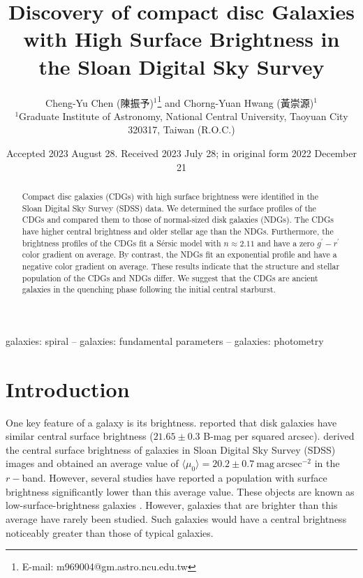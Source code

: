 \documentclass[fleqn,usenatbib]{mnras}
\title[CDGs in SDSS]{Discovery of compact disc Galaxies with High Surface Brightness in the Sloan Digital Sky Survey}
\author[Chen \& Hwang]{
Cheng-Yu Chen (陳振予)$^{1}$\thanks{E-mail: m969004@gm.astro.ncu.edu.tw}
and Chorng-Yuan Hwang (黃崇源)$^{1}$
\\
$^{1}$Graduate Institute of Astronomy, National Central University, Taoyuan City 320317, Taiwan (R.O.C.)\\
}
\date{Accepted 2023 August 28. Received 2023 July 28; in original form 2022 December 21}
\begin{document}
\begin{CJK*}{UTF8}{bkai}
\label{firstpage}
\pagerange{\pageref{firstpage}--\pageref{lastpage}}
\maketitle
\end{CJK*}

\begin{abstract}
Compact disc galaxies (CDGs) with high surface brightness were identified in the Sloan Digital Sky Survey (SDSS) data.
We determined the surface profiles of the CDGs and compared them to those of normal-sized disk galaxies (NDGs).
The CDGs have higher central brightness and older stellar age than the NDGs.
Furthermore, the brightness profiles of the CDGs fit a S{\'e}rsic model with $n \approx 2.11$ and have a zero $g^{\prime}-r^{\prime}$ color gradient on average.
By contrast, the NDGs fit an exponential profile and have a negative color gradient on average.
These results indicate that the structure and stellar population of the CDGs and NDGs differ.
We suggest that the CDGs are ancient galaxies in the quenching phase following the initial central starburst.
\end{abstract}

\begin{keywords}
galaxies: spiral -- galaxies: fundamental parameters -- galaxies: photometry
\end{keywords}



\section{Introduction}

One key feature of a galaxy is its brightness.
\citet{1970ApJ...160..811F} reported that disk galaxies have similar central surface brightness ($21.65\pm0.3$ B-mag per squared arcsec).
\citet{2010ApJ...722L.120F} derived the central surface brightness of galaxies in Sloan Digital Sky Survey (SDSS) images and obtained an average value of $\langle \mu_0 \rangle =20.2\pm0.7~\mathrm{mag}~\mathrm{arcsec^{-2}}$ in the $r-$band.
However, several studies have reported a population with surface brightness significantly lower than this average value.
These objects are known as low-surface-brightness galaxies \citep[LSBGs, e.g.][]{2003A&A...405...99M,2011ApJ...728...74G,2019MNRAS.483.1754D}.
However, galaxies that are brighter than this average have rarely been studied.
Such galaxies would have a central brightness noticeably greater than those of typical galaxies.
\end{document}
